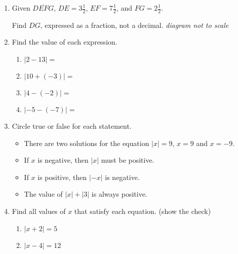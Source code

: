 \begin{enumerate}
\newpage
\item Given $\overline{DEFG}$, $DE=3 \frac{1}{2}$, $EF=7 \frac{1}{2}$, and $FG= 2 \frac{1}{2}$. \par \medskip
Find ${DG}$, expressed as a fraction, not a decimal. \hfill  \emph{diagram not to scale} \medskip
\begin{flushleft}
\end{flushleft} \vspace{2cm}

\item Find the value of each expression.
  \begin{multicols}{2}
    \begin{enumerate}[itemsep=1cm]
      \item $|2-13|=$
      \item $|10+(-3)|=$
      \item $|4-(-2)|=$
      \item $|-5-(-7)|=$
    \end{enumerate}
  \end{multicols} \bigskip

\item Circle true or false for each statement. \bigskip
  \begin{itemize}[label={\textbf{T \; F \;}}, itemsep=0.5cm]
    \item There are two solutions for the equation $|x|=9$, $x=9$ and $x=-9$.
    \item If $x$ is negative, then $|x|$ must be positive.
    \item If $x$ is positive, then $|-x|$ is negative.
    \item The value of $|x|+|3|$ is always positive.
  \end{itemize} \bigskip

\item Find all values of $x$ that satisfy each equation. (show the check) \bigskip
  \begin{multicols}{2} 
    \begin{enumerate}
      \item $|x+2|=5$
      \item $|x-4|=12$
    \end{enumerate}
  \end{multicols}


\end{enumerate}
